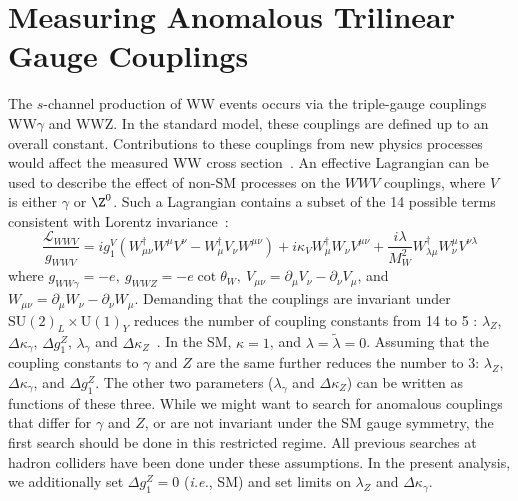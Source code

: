 \clearpage{}
\section{Measuring Anomalous Trilinear Gauge Couplings}
\label{sec:atgc}

The $s$-channel production of WW events occurs via the triple-gauge couplings 
WW$\gamma$ and WWZ.  
In the standard model, these couplings are defined  up to an overall constant. 
Contributions to these couplings from new physics processes would 
affect the measured WW cross section~\cite{Hagiwara1987253}.  
An effective Lagrangian can be used to describe the effect of non-SM 
processes on the $WWV$ couplings, where $V$ is either $\gamma$ or $\Z^0$. 
Such a Lagrangian contains a subset of the 14
possible terms consistent with Lorentz invariance~\cite{Hagiwara1987253}:
\begin{equation*}
\frac{\mathcal{L}_{WWV}}{g_{WWV}}  = i g_1^V \left(
W^{\dagger}_{\mu\nu}W^{\mu}V^{\nu} -
W^{\dagger}_{\mu}V_{\nu}W^{\mu\nu} \right) + i\kappa_V
W^{\dagger}_{\mu}W_{\nu}V^{\mu\nu} + \frac{i\lambda}{M_W^2}
W^{\dagger}_{\lambda\mu} W^{\mu}_{\nu} V^{\nu\lambda} %
\end{equation*}
\noindent
where $g_{WW\gamma} = -e,~g_{WWZ} = -e\cot\theta_W,~V_{\mu\nu} = \partial_{\mu} 
V_{\nu} - \partial_{\nu} V_{\mu}$, and $W_{\mu\nu} = \partial_{\mu} W_{\nu} - 
\partial_{\nu} W_{\mu}$.  
Demanding that the couplings are invariant
under $\mathrm{SU}(2)_L \times \mathrm{U}(1)_Y$ reduces the number
of coupling constants from 14 to 5 \cite{PhysRevD.41.2113}: 
$\lambda_Z$, $\Delta{\kappa_\gamma}$, $\Delta{g_1^Z}$, 
$\lambda_\gamma$ and $\Delta{\kappa_Z}$~\cite{MCFM}.
In the SM, $\kappa = 1$, and $\lambda = \tilde{\lambda} = 0$.
Assuming that the
coupling constants to $\gamma$ and $Z$ are the same 
further reduces the number to 3: 
$\lambda_Z$, $\Delta{\kappa_\gamma}$, and $\Delta{g_1^Z}$. 
The other two parameters ($\lambda_\gamma$ and $\Delta{\kappa_Z}$) 
can be written as functions of these three.
While we might want to search for anomalous couplings that differ for
$\gamma$ and $Z$, or are not invariant under the SM gauge symmetry,
the first search should be done in this restricted regime.  All
previous searches at hadron colliders have been done under these
assumptions.
In the present analysis, we additionally set $\Delta{g_1^Z} = 0$
(\textit{i.e.}, SM) and set limits on $\lambda_Z$ and $\Delta{\kappa_\gamma}$.


